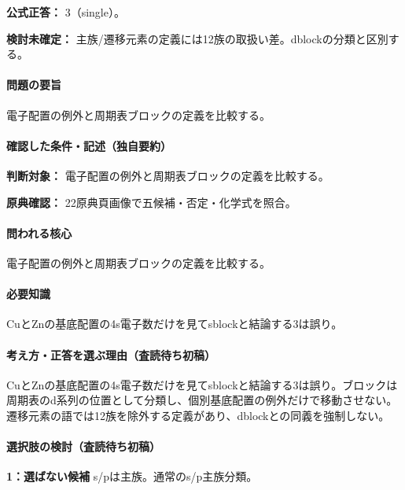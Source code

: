 \textbf{公式正答：} 3（single）。

\par\textbf{検討未確定：} 主族/遷移元素の定義には12族の取扱い差。dblockの分類と区別する。

\paragraph{問題の要旨} 電子配置の例外と周期表ブロックの定義を比較する。

\paragraph{確認した条件・記述（独自要約）}\mbox{}\par

\noindent\textbf{判断対象：} 電子配置の例外と周期表ブロックの定義を比較する。\par

\noindent\textbf{原典確認：} 22原典頁画像で五候補・否定・化学式を照合。\par

\paragraph{問われる核心} 電子配置の例外と周期表ブロックの定義を比較する。

\paragraph{必要知識} CuとZnの基底配置の4s電子数だけを見てsblockと結論する3は誤り。

\paragraph{考え方・正答を選ぶ理由（査読待ち初稿）} CuとZnの基底配置の4s電子数だけを見てsblockと結論する3は誤り。ブロックは周期表のd系列の位置として分類し、個別基底配置の例外だけで移動させない。遷移元素の語では12族を除外する定義があり、dblockとの同義を強制しない。

\paragraph{選択肢の検討（査読待ち初稿）}\mbox{}\par

\noindent\textbf{1：選ばない候補} s/pは主族。通常のs/p主族分類。\par

